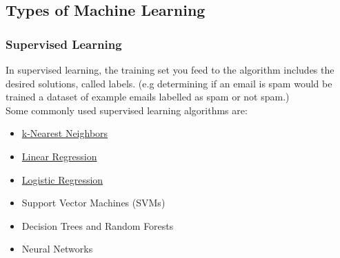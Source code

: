 \documentclass[12pt]{article}
\begin{document}
\subsection{Types of Machine Learning}
    \subsubsection{Supervised Learning}
        In supervised learning, the training set you feed to the algorithm includes the desired solutions, called
        labels. (e.g determining if an email is spam would be trained a dataset of example emails labelled as spam or
        not spam.) \\[0.1in] 
        Some commonly used supervised learning algorithms are:
        \begin{itemize}
            \item \hyperref[sec:KNN]{k-Nearest Neighbors}
            \item \hyperref[sec:LinearRegression]{Linear Regression}
            \item \hyperref[sec:LogisticRegression]{Logistic Regression}
            \item Support Vector Machines (SVMs)
            \item Decision Trees and Random Forests
            \item Neural Networks
        \end{itemize}
    
\end{document}
